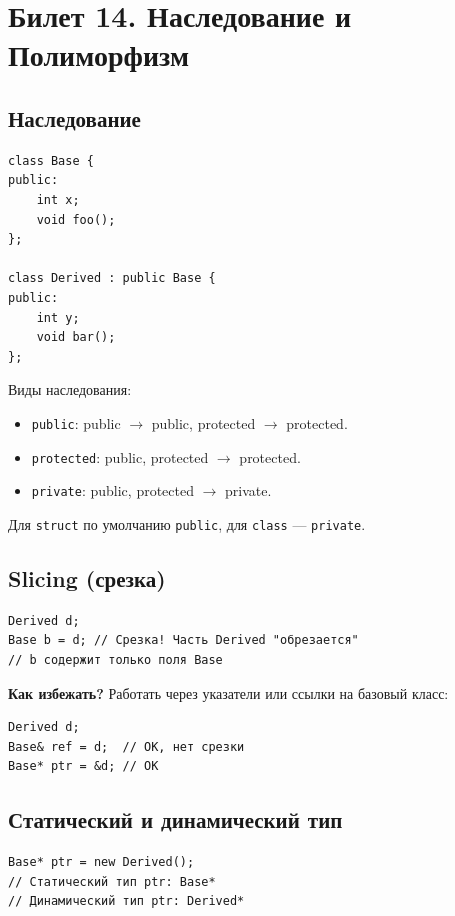 \documentclass[12pt,a4paper]{article}
\begin{document}
\section{Билет 14. Наследование и Полиморфизм}

\subsection{Наследование}

\begin{lstlisting}
class Base {
public:
    int x;
    void foo();
};

class Derived : public Base {
public:
    int y;
    void bar();
};
\end{lstlisting}

Виды наследования:
\begin{itemize}
    \item \texttt{public}: public $\to$ public, protected $\to$ protected.
    \item \texttt{protected}: public, protected $\to$ protected.
    \item \texttt{private}: public, protected $\to$ private.
\end{itemize}

Для \texttt{struct} по умолчанию \texttt{public}, для \texttt{class} --- \texttt{private}.

\subsection{Slicing (срезка)}

\begin{lstlisting}
Derived d;
Base b = d; // Срезка! Часть Derived "обрезается"
// b содержит только поля Base
\end{lstlisting}

\textbf{Как избежать?} Работать через указатели или ссылки на базовый класс:
\begin{lstlisting}
Derived d;
Base& ref = d;  // OK, нет срезки
Base* ptr = &d; // OK
\end{lstlisting}

\subsection{Статический и динамический тип}

\begin{lstlisting}
Base* ptr = new Derived();
// Статический тип ptr: Base*
// Динамический тип ptr: Derived*
\end{lstlisting}
\end{document}
